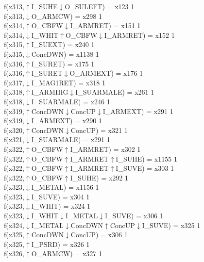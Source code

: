 f(x313,$\uparrow$I\_SUHE$\downarrow$O\_SULEFT) = x123 {1} \\
f(x313,$\downarrow$O\_ARMCW) = x298 {1} \\
f(x314,$\uparrow$O\_CBFW$\downarrow$I\_ARMRET) = x151 {1} \\
f(x314,$\downarrow$I\_WHIT$\uparrow$O\_CBFW$\downarrow$I\_ARMRET) = x152 {1} \\
f(x315,$\uparrow$I\_SUEXT) = x240 {1} \\
f(x315,$\downarrow$ConcDWN) = x1138 {1} \\
f(x316,$\uparrow$I\_SURET) = x175 {1} \\
f(x316,$\uparrow$I\_SURET$\downarrow$O\_ARMEXT) = x176 {1} \\
f(x317,$\downarrow$I\_MAG1RET) = x318 {1} \\
f(x318,$\uparrow$I\_ARMHIG$\downarrow$I\_SUARMALE) = x261 {1} \\
f(x318,$\downarrow$I\_SUARMALE) = x246 {1} \\
f(x319,$\uparrow$ConcDWN$\downarrow$ConcUP$\downarrow$I\_ARMEXT) = x291 {1} \\
f(x319,$\downarrow$I\_ARMEXT) = x290 {1} \\
f(x320,$\uparrow$ConcDWN$\downarrow$ConcUP) = x321 {1} \\
f(x321,$\downarrow$I\_SUARMALE) = x291 {1} \\
f(x322,$\uparrow$O\_CBFW$\uparrow$I\_ARMRET) = x302 {1} \\
f(x322,$\uparrow$O\_CBFW$\uparrow$I\_ARMRET$\uparrow$I\_SUHE) = x1155 {1} \\
f(x322,$\uparrow$O\_CBFW$\uparrow$I\_ARMRET$\uparrow$I\_SUVE) = x303 {1} \\
f(x322,$\uparrow$O\_CBFW$\uparrow$I\_SUHE) = x292 {1} \\
f(x323,$\downarrow$I\_METAL) = x1156 {1} \\
f(x323,$\downarrow$I\_SUVE) = x304 {1} \\
f(x323,$\downarrow$I\_WHIT) = x324 {1} \\
f(x323,$\downarrow$I\_WHIT$\downarrow$I\_METAL$\downarrow$I\_SUVE) = x306 {1} \\
f(x324,$\downarrow$I\_METAL$\downarrow$ConcDWN$\uparrow$ConcUP$\downarrow$I\_SUVE) = x325 {1} \\
f(x325,$\uparrow$ConcDWN$\downarrow$ConcUP) = x306 {1} \\
f(x325,$\uparrow$I\_PSRD) = x326 {1} \\
f(x326,$\uparrow$O\_ARMCW) = x327 {1} \\
